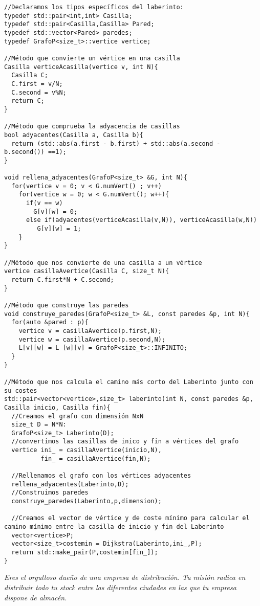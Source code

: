 \begin{verbatim}
//Declaramos los tipos específicos del laberinto:
typedef std::pair<int,int> Casilla;
typedef std::pair<Casilla,Casilla> Pared;
typedef std::vector<Pared> paredes;
typedef GrafoP<size_t>::vertice vertice;

//Método que convierte un vértice en una casilla
Casilla verticeAcasilla(vertice v, int N){
  Casilla C;
  C.first = v/N;
  C.second = v%N;
  return C;
}

//Método que comprueba la adyacencia de casillas
bool adyacentes(Casilla a, Casilla b){
  return (std::abs(a.first - b.first) + std::abs(a.second - b.second()) ==1);
}

void rellena_adyacentes(GrafoP<size_t> &G, int N){
  for(vertice v = 0; v < G.numVert() ; v++)
    for(vertice w = 0; w < G.numVert(); w++){
      if(v == w)
        G[v][w] = 0;
      else if(adyacentes(verticeAcasilla(v,N)), verticeAcasilla(w,N))
         G[v][w] = 1;
    }
}

//Método que nos convierte de una casilla a un vértice
vertice casillaAvertice(Casilla C, size_t N){
  return C.first*N + C.second;
}

//Método que construye las paredes
void construye_paredes(GrafoP<size_t> &L, const paredes &p, int N){
  for(auto &pared : p){
    vertice v = casillaAvertice(p.first,N);
    vertice w = casillaAvertice(p.second,N);
    L[v][w] = L [w][v] = GrafoP<size_t>::INFINITO;
  }
}

//Método que nos calcula el camino más corto del Laberinto junto con su costes
std::pair<vector<vertice>,size_t> laberinto(int N, const paredes &p, Casilla inicio, Casilla fin){
  //Creamos el grafo con dimensión NxN
  size_t D = N*N:
  GrafoP<size_t> Laberinto(D);
  //convertimos las casillas de inico y fin a vértices del grafo
  vertice ini_ = casillaAvertice(inicio,N),
          fin_ = casillaAvertice(fin,N);

  //Rellenamos el grafo con los vértices adyacentes
  rellena_adyacentes(Laberinto,D);
  //Construimos paredes
  construye_paredes(Laberinto,p,dimension);

  //Creamos el vector de vértice y de coste mínimo para calcular el camino mínimo entre la casilla de inicio y fin del Laberinto
  vector<vertice>P;
  vector<size_t>costemin = Dijkstra(Laberinto,ini_,P);
  return std::make_pair(P,costemin[fin_]);
}
\end{verbatim}

\textbf{\large{}}\textit{ Eres el orgulloso dueño de una empresa de distribución. Tu misión radica en distribuir todo tu stock entre las diferentes ciudades en las que tu empresa dispone de almacén.}

